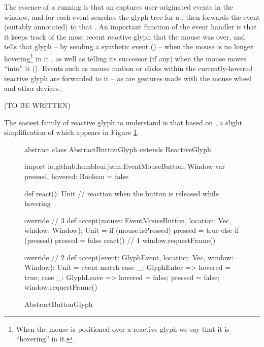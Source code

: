The essence of a running  is that an 
captures user-originated events in the window, and for each 
event searches the glyph tree for a , then
forwards the event (suitably annotated) to that .
An important function of the event handler is that it keeps track
of the most recent reactive glyph that the mouse was over, and tells
that glyph -- by sending a synthetic event () --
when the mouse is no longer hovering\footnote{When the mouse is
positioned over a reactive glyph we say that it is ``hovering'' in
it.} in it , as well as telling its successor (if any) when the
mouse moves “into” it ().  Events such as mouse motion or
clicks within the currently-hovered reactive glyph are forwarded
to it -- as are gestures made with the mouse wheel and other devices.



(TO BE WRITTEN)



The easiest family of reactive glyph to understand is that based
on , a slight simplification of which appears in
Figure \ref{AbstractButtonGlyph}.

\begin{figure}[t]
\begin{scala}
 abstract class AbstractButtonGlyph extends ReactiveGlyph {
   import io.github.humbleui.jwm.{EventMouseButton, Window}
   var pressed, hovered: Boolean = false

   def react(): Unit // reaction when the button is released while hovering

   override                             // 3
   def accept(mouse: EventMouseButton, location: Vec, window: Window): Unit = {
     if (mouse.isPressed) {
       pressed = true
     } else {
     if (pressed) {
         pressed = false
         react()                        // 1
       }
     }
     window.requestFrame()
   }

   override                             // 2
   def accept(event: GlyphEvent, location: Vec, window: Window): Unit = {
     event match {
       case _: GlyphEnter => hovered = true;
       case _: GlyphLeave => hovered = false; pressed = false;
     }
     window.requestFrame()
   }

 }
\end{scala}
\caption{AbstractButtonGlyph}
\label{AbstractButtonGlyph}
\end{figure}

